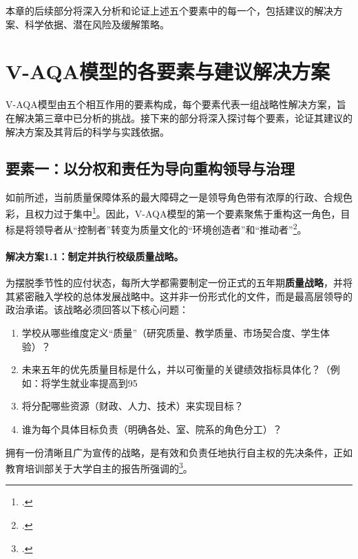 本章的后续部分将深入分析和论证上述五个要素中的每一个，包括建议的解决方案、科学依据、潜在风险及缓解策略。






\section{V-AQA模型的各要素与建议解决方案}
\label{sec:cac_thanh_to_vqa}

V-AQA模型由五个相互作用的要素构成，每个要素代表一组战略性解决方案，旨在解决第三章中已分析的挑战。接下来的部分将深入探讨每个要素，论证其建议的解决方案及其背后的科学与实践依据。

\subsection{要素一：以分权和责任为导向重构领导与治理}
\label{subsec:giaiphap_lanhdao}

如前所述，当前质量保障体系的最大障碍之一是领导角色带有浓厚的行政、合规色彩，且权力过于集中\footcite{vnujs_fs_4303}。因此，V-AQA模型的第一个要素聚焦于重构这一角色，目标是将领导者从“控制者”转变为质量文化的“环境创造者”和“推动者”\footcite{unesco_gem_report_2024}。

\paragraph{解决方案1.1：制定并执行校级质量战略。}
为摆脱季节性的应付状态，每所大学都需要制定一份正式的五年期\textbf{质量战略}，并将其紧密融入学校的总体发展战略中。这并非一份形式化的文件，而是最高层领导的政治承诺。该战略必须回答以下核心问题：
\begin{enumerate}
    \item 学校从哪些维度定义“质量”（研究质量、教学质量、市场契合度、学生体验）？
    \item 未来五年的优先质量目标是什么，并以可衡量的关键绩效指标具体化？（例如：将学生就业率提高到95%
    \item 将分配哪些资源（财政、人力、技术）来实现目标？
    \item 谁为每个具体目标负责（明确各处、室、院系的角色分工）？
\end{enumerate}
拥有一份清晰且广为宣传的战略，是有效和负责任地执行自主权的先决条件，正如教育培训部关于大学自主的报告所强调的\footcite{moet_report_autonomy}。

